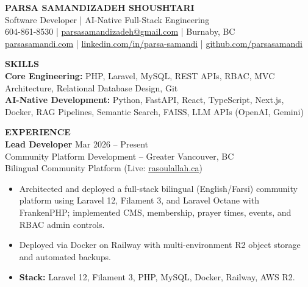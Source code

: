 \documentclass[10pt,letterpaper]{article}
\begin{document}
\begin{center}
    {\Large \textbf{PARSA SAMANDIZADEH SHOUSHTARI}}\\[3pt]
    Software Developer | AI-Native Full-Stack Engineering \\[6pt]
    604-861-8530 | \href{mailto:parsasamandizadeh@gmail.com}{parsasamandizadeh@gmail.com} | Burnaby, BC\\
    \href{https://parsasamandi.com}{parsasamandi.com} | \href{https://www.linkedin.com/in/parsa-samandi/}{linkedin.com/in/parsa-samandi} | \href{https://github.com/parsasamandi}{github.com/parsasamandi}
\end{center}

\vspace{5pt}

\textbf{SKILLS}\\[4pt]

\textbf{Core Engineering:} PHP, Laravel, MySQL, REST APIs, RBAC, MVC Architecture, Relational Database Design, Git\\
\textbf{AI-Native Development:} Python, FastAPI, React, TypeScript, Next.js, Docker, RAG Pipelines, Semantic Search, FAISS, LLM APIs (OpenAI, Gemini)

\vspace{8pt}

\textbf{EXPERIENCE}\\[4pt]

\textbf{Lead Developer} \hfill Mar 2026 -- Present\\
Community Platform Development -- Greater Vancouver, BC\\
Bilingual Community Platform (Live: \href{https://www.rasoulallah.ca/}{rasoulallah.ca})
\begin{itemize}
    \item Architected and deployed a full-stack bilingual (English/Farsi) community platform using Laravel 12, Filament 3, and Laravel Octane with FrankenPHP; implemented CMS, membership, prayer times, events, and RBAC admin controls.
    \item Deployed via Docker on Railway with multi-environment R2 object storage and automated backups.
    \item \textbf{Stack:} Laravel 12, Filament 3, PHP, MySQL, Docker, Railway, AWS R2.
\end{itemize}
\end{document}
